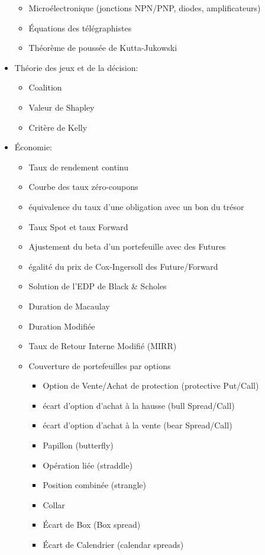 \begin{itemize}
\begin{itemize}
				\item Micro\'electronique (jonctions NPN/PNP, diodes, amplificateurs)
				\item \'Equations des t\'el\'egraphistes
				\item Th\'eorème de pouss\'ee de Kutta-Jukowski
			\end{itemize} 
		\item Th\'eorie des jeux et de la d\'ecision: 
			\begin{itemize}
				\item Coalition
				\item Valeur de Shapley
				\item Critère de Kelly 
			\end{itemize}
		\item \'Economie: 
			\begin{itemize}
				\item Taux de rendement continu
				\item Courbe des taux z\'ero-coupons
				\item \'equivalence du taux d'une obligation avec un bon du tr\'esor
				\item Taux Spot et taux Forward
				\item Ajustement du beta d'un portefeuille avec des Futures
				\item \'egalit\'e du prix de Cox-Ingersoll des Future/Forward
				\item Solution de l'EDP de Black \& Scholes
				\item Duration de Macaulay
				\item Duration Modifi\'ee
				\item Taux de Retour Interne Modifi\'e (MIRR)
				\item Couverture de portefeuilles par options
				\begin{itemize}
					\item Option de Vente/Achat de protection (protective Put/Call)
					\item \'ecart d'option d'achat à la hausse (bull Spread/Call)
					\item \'ecart d'option d'achat à la vente (bear Spread/Call)
					\item Papillon (butterfly)
					\item Op\'eration li\'ee (straddle)
					\item Position combin\'ee (strangle)
					\item Collar
					\item \'Ecart de Box (Box spread)
					\item \'Ecart de Calendrier (calendar spreads)

\end{itemize}
\end{itemize}
\end{itemize}

